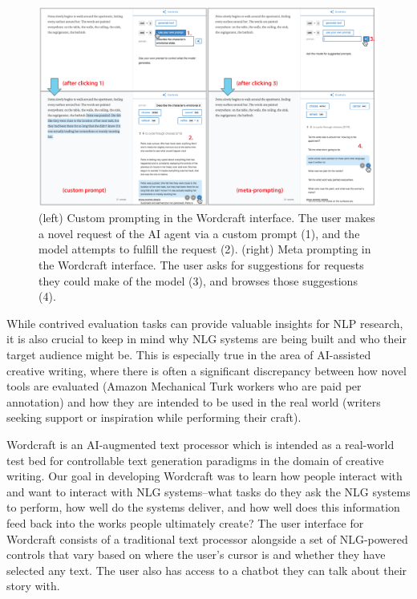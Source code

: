 \begin{figure}[tbh]
  \centering
  \includegraphics[width=0.99\linewidth]{figures/interface_meta_custom}
  \caption{(left) Custom prompting in the Wordcraft interface. The user makes a novel request of the AI agent via a custom prompt (1), and the model attempts to fulfill the request (2). (right) Meta prompting in the Wordcraft interface. The user asks for suggestions for requests they could make of the model (3), and browses those suggestions (4).}
  \label{fig:interface_meta_custom}
\end{figure}

While contrived evaluation tasks can provide valuable insights for NLP research, it is also crucial to keep in mind why NLG systems are being built and who their target audience might be.
This is especially true in the area of AI-assisted creative writing, where there is often a significant discrepancy between how novel tools are evaluated (Amazon Mechanical Turk workers who are paid per annotation) and how they are intended to be used in the real world (writers seeking support or inspiration while performing their craft).

Wordcraft is an AI-augmented text processor which is intended as a real-world test bed for controllable text generation paradigms in the domain of creative writing.
Our goal in developing Wordcraft was to learn how people interact with and want to interact with NLG systems--what tasks do they ask the NLG systems to perform, how well do the systems deliver, and how well does this information feed back into the works people ultimately create?
The user interface for Wordcraft consists of a traditional text processor alongside a set of NLG-powered controls that vary based on where the user's cursor is and whether they have selected any text.
The user also has access to a chatbot they can talk about their story with.


